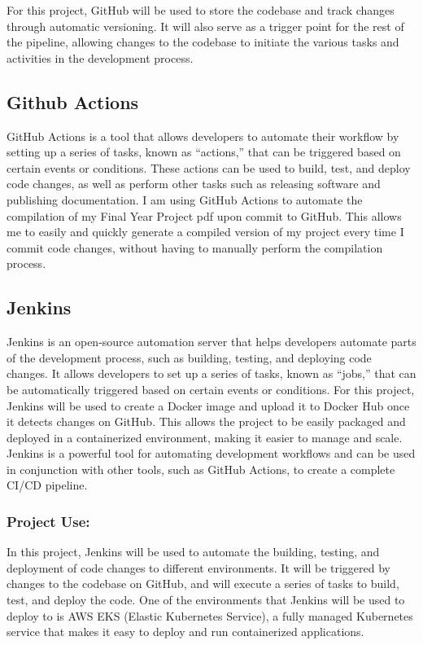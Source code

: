 \documentclass[
  10pt,
  paper=a4,
  ,captions=tableheading
]{scrartcl}
\begin{document}
For this project, GitHub will be used to store the codebase and track
changes through automatic versioning. It will also serve as a trigger
point for the rest of the pipeline, allowing changes to the codebase to
initiate the various tasks and activities in the development process.

\hypertarget{github-actions}{%
\subsection{Github Actions}\label{github-actions}}

GitHub Actions is a tool that allows developers to automate their
workflow by setting up a series of tasks, known as ``actions,'' that can
be triggered based on certain events or conditions. These actions can be
used to build, test, and deploy code changes, as well as perform other
tasks such as releasing software and publishing documentation. I am
using GitHub Actions to automate the compilation of my Final Year
Project pdf upon commit to GitHub. This allows me to easily and quickly
generate a compiled version of my project every time I commit code
changes, without having to manually perform the compilation process.

\hypertarget{jenkins}{%
\subsection{Jenkins}\label{jenkins}}

Jenkins is an open-source automation server that helps developers
automate parts of the development process, such as building, testing,
and deploying code changes. It allows developers to set up a series of
tasks, known as ``jobs,'' that can be automatically triggered based on
certain events or conditions. For this project, Jenkins will be used to
create a Docker image and upload it to Docker Hub once it detects
changes on GitHub. This allows the project to be easily packaged and
deployed in a containerized environment, making it easier to manage and
scale. Jenkins is a powerful tool for automating development workflows
and can be used in conjunction with other tools, such as GitHub Actions,
to create a complete CI/CD pipeline.

\hypertarget{project-use-2}{%
\subsubsection{Project Use:}\label{project-use-2}}

In this project, Jenkins will be used to automate the building, testing,
and deployment of code changes to different environments. It will be
triggered by changes to the codebase on GitHub, and will execute a
series of tasks to build, test, and deploy the code. One of the
environments that Jenkins will be used to deploy to is AWS EKS (Elastic
Kubernetes Service), a fully managed Kubernetes service that makes it
easy to deploy and run containerized applications.
\end{document}
